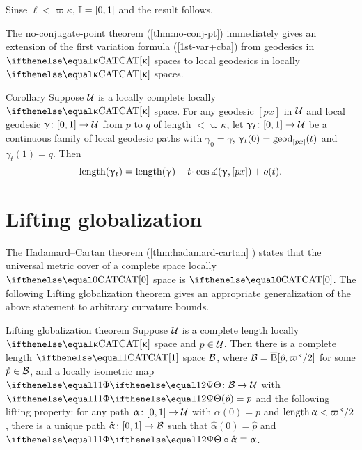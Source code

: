 Sinse $\ell<\varpi\kappa$, 
$\mathbb{I}=[0,1]$ and the result follows. 
\qeds

The no-conjugate-point theorem  (\ref{thm:no-conj-pt}) immediately gives an extension of the first variation formula (\ref{1st-var+cba}) from geodesics in $\CAT\kappa$ spaces to local geodesics in locally $\CAT\kappa$ spaces.

  \begin{thm}{Corollary}\label{cor:1st-var++cba}
Suppose $\mathcal{U}$ is a locally complete locally $\CAT\kappa$ space. 
For any geodesic $[px]$ in $\mathcal{U}$ and local geodesic $\gamma\:[0,1]\to \spc{U}$ from $p$ to $q$ of  length $<\varpi\kappa$, let  $\gamma_t\:[0,1]\to \spc{U}$ be a continuous family of local geodesic paths with $\gamma_0=\gamma$, $\upgamma_t(0)=\mathrm{geod}_{[p x]}(t)$ and $\gamma_t(1)=q$.  Then
\[\length(\gamma_t)
=
\length(\gamma)-t\cdot\cos\mangle(\gamma,[px])+o(t).
\]

\end{thm}





\section{Lifting globalization}\label{sec:cat-globalize}

The Hadamard--Cartan theorem (\ref{thm:hadamard-cartan} ) states that 
the universal metric cover of a complete space locally $\CAT0$ space is $\CAT0$.
The following Lifting globalization theorem gives an appropriate generalization of the above statement to arbitrary curvature bounds.



\begin{thm}{Lifting globalization theorem}
\label{thm:globalization-lift}
Suppose $\mathcal{U}$ is a complete length locally $\CAT\kappa$ space and  $p\in\spc{U}$.
Then there is a complete length $\CAT1$ space $\mathcal{B}$, where $\spc{B}=\cBall[\hat p,\varpi\kappa/2]$ for some $\hat p \in \spc{B}$,
and a locally isometric map $\map\:\spc{B}\to\spc{U}$
with $\map(\hat p)=p$ and the following lifting property: 
for any path $\alpha\:[0,1]\to\spc{U}$ with $\alpha(0)=p$ and $\length\alpha<\varpi\kappa/2$, 
there is a unique path $\hat\alpha \:[0,1]\to \spc{B}$ such that $\hat\alpha(0)=\hat p$ 
and $\map\circ\hat\alpha\equiv\alpha$.
\end{thm}

